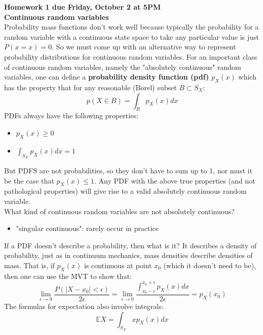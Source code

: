 \documentclass[12pt]{article}
\numberwithin{equation}{section}
\begin{document}
\textbf{Homework 1 due Friday, October 2 at 5PM\\
Continuous random variables}\\
Probability mass functions don't work well because typically the probability for a random variable with a continuous state space to take any particular value is just $P(x=x)=0$. So we must come up with an alternative way to represent probability distributions for continuous random variables. For an important class of continuous random variables, namely the "absolutely continuous" random variables, one can define a \textbf{probability density function (pdf)} $p_X(x)$ which has the property that for any reasonable (Borel) subset $B\subset S_X$:
$$p(X\in B)=\int_R p_X(x)dx$$
PDFs always have the following properties:
\begin{itemize}
\item $p_X(x)\geq0$
\item $\int_{S_X}p_X(x)dx=1$
\end{itemize}

But PDFS are not probabilities, so they don't have to sum up to 1, nor must it be the case that $p_X(x)\leq 1$. Any PDF with the above true properties (and not pathological properties) will give rise to a valid absolutely continuous random variable.\\

What kind of continuous random variables are not absolutely continuous?
\begin{itemize}
\item "singular continuous": rarely occur in practice
\end{itemize}

If a PDF doesn't describe a probability, then what is it? It describes a density of probability, just as in continuum mechanics, mass densities describe densities of mass. That is, if $p_X(x)$ is continuous at point $x_0$ (which it doesn't need to be), then one can use the MVT to show that:
$$\lim_{\epsilon\to 0}\frac{P(|X-x_0|<\epsilon)}{2\epsilon}=\lim_{\epsilon\to 0}\frac{\int_{x_0-\epsilon}^{x_0+\epsilon}p_X(x)dx}{2\epsilon}=p_X(x_0)$$
The formulas for expectation also involve integrals:
$$\mathbb{E}X=\int_{S_X} xp_X(x)dx$$
\end{document}
